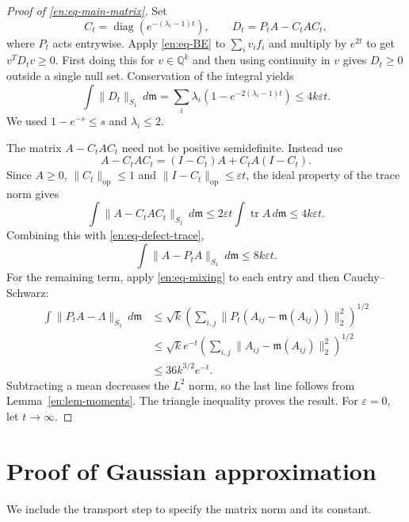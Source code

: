 \documentclass[12pt]{amsart}
\theoremstyle{definition}
\theoremstyle{remark}
\numberwithin{equation}{section}
\DeclareMathOperator{\tr}{tr}
\newcommand{\Q}{\mathbb{Q}}
\newcommand{\m}{\mathfrak m}
\theoremstyle{jpplain}
\begin{document}
\begin{proof}[Proof of \eqref{en:eq-main-matrix}]
Set
\[
 C_t=\operatorname{diag}(e^{-(\lambda_i-1)t}),\qquad
 D_t=P_tA-C_tAC_t,
\]
where $P_t$ acts entrywise.  Apply \eqref{en:eq-BE} to
$\sum_i v_i f_i$ and multiply by $e^{2t}$ to get $v^TD_tv\geq0$.
First doing this for $v\in\Q^k$ and then using continuity in $v$ gives
$D_t\geq0$ outside a single null set.  Conservation of the integral yields
\begin{equation}\label{en:eq-defect-trace}
 \int\|D_t\|_{S_1}\,d\m
 =\sum_i\lambda_i(1-e^{-2(\lambda_i-1)t})
 \leq4k\varepsilon t.
\end{equation}
We used $1-e^{-s}\leq s$ and $\lambda_i\leq2$.

The matrix $A-C_tAC_t$ need not be positive semidefinite.  Instead use
\[
 A-C_tAC_t=(I-C_t)A+C_tA(I-C_t).
\]
Since $A\geq0$, $\|C_t\|_{\mathrm{op}}\leq1$ and
$\|I-C_t\|_{\mathrm{op}}\leq\varepsilon t$, the ideal property of the
trace norm gives
\[
 \int\|A-C_tAC_t\|_{S_1}\,d\m
 \leq2\varepsilon t\int\tr A\,d\m
 \leq4k\varepsilon t.
\]
Combining this with \eqref{en:eq-defect-trace},
\begin{equation}\label{en:eq-time-defect}
 \int\|A-P_tA\|_{S_1}\,d\m\leq8k\varepsilon t.
\end{equation}
For the remaining term, apply \eqref{en:eq-mixing} to each entry and then
Cauchy--Schwarz:
\begin{align*}
 \int\|P_tA-\Lambda\|_{S_1}\,d\m
 &\leq\sqrt{k}\left(\sum_{i,j}
       \|P_t(A_{ij}-\m(A_{ij}))\|_2^2\right)^{1/2}\\
 &\leq\sqrt{k}e^{-t}
       \left(\sum_{i,j}\|A_{ij}-\m(A_{ij})\|_2^2\right)^{1/2}\\
 &\leq36k^{3/2}e^{-t}.
\end{align*}
Subtracting a mean decreases the $L^2$ norm, so the last line follows from
Lemma~\ref{en:lem-moments}.  The triangle inequality proves the result.
For $\varepsilon=0$, let $t\to\infty$.
\end{proof}

\section{Proof of Gaussian approximation}

We include the transport step to specify the matrix norm and its constant.
\end{document}
